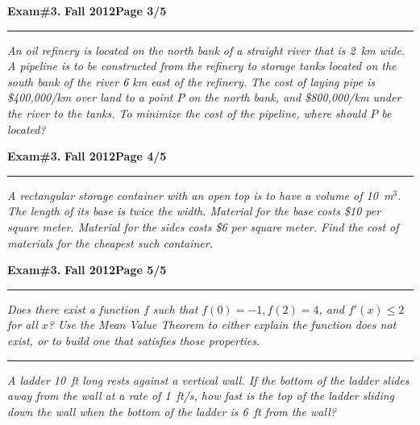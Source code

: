 \documentclass[12pt]{article}
\begin{document}
\hfill{\large\bf Exam\#3.}\hfill{\large\bf
  Fall 2012}\hfill{\large\bf Page 3/5}\hrule

\bigskip
{\problem[20 pts] \em An oil refinery is located on the north bank of a
straight river that is 2~km wide.  A pipeline is to be constructed from
the refinery to storage tanks located on the south bank of the river 6
km east of the refinery.  The cost of laying pipe is \$400,000/km over
land to a point $P$ on the north bank, and \$800,000/km under the river
to the tanks.  To minimize the cost of the pipeline, where should $P$ be
located?}
\vspace{18cm}
\begin{flushright}
\end{flushright}
\newpage

\hfill{\large\bf Exam\#3.}\hfill{\large\bf
  Fall 2012}\hfill{\large\bf Page 4/5}\hrule

\bigskip
{\problem[20 pts] \em A rectangular storage container with an open top
is to have a volume of 10~m$^3$.  The length of its base is twice the
width.  Material for the base costs \$10 per square meter.  Material for
the sides costs \$6 per square meter.  Find the cost of materials for
the cheapest such container.}
\vspace{18cm}
\begin{flushright}
\end{flushright}
\newpage


\hfill{\large\bf Exam\#3.}\hfill{\large\bf
  Fall 2012}\hfill{\large\bf Page 5/5}\hrule

\bigskip
{\problem[10 pts] \em Does there exist a function $f$ such that $f(0)=-1,
f(2)=4$, and $f'(x)\leq 2$ for all $x$?  Use the Mean Value Theorem to
either explain the function does not exist, or to build one that
satisfies those properties.}
\vspace{8cm}
\hrule
{\problem[20 pts] \em A ladder 10~ft long rests against a vertical wall.  If
the bottom of the ladder slides away from the wall at a rate of 1~ft/s,
how fast is the top of the ladder sliding down the wall when the bottom
of the ladder is 6~ft from the wall?}
\vspace{10cm}
\begin{flushright}
\end{flushright}
\end{document}

